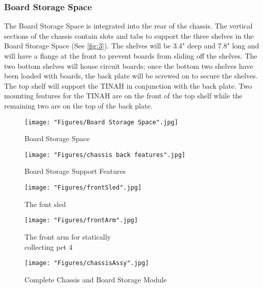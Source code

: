 \documentclass[11pt, oneside]{article} %
\begin{document}
		\subsubsection{Board Storage Space}

		The Board Storage Space is integrated into the rear of the chassis. The vertical sections of the chassis contain slots and tabs to support the three shelves in the Board Storage Space (See \autoref{fig:3}). The shelves will be 3.4" deep and 7.8" long and will have a flange at the front to prevent boards from sliding off the shelves. The two bottom shelves will house circuit boards; once the bottom two shelves have been loaded with boards, the back plate will be screwed on to secure the shelves. The top shelf will support the TINAH in conjunction with the back plate. Two mounting features for the TINAH are on the front of the top shelf while the remaining two are on the top of the back plate.
		
		\newpage
		\begin{figure}[ht]
			\centering
			\begin{minipage}[t]{.5\textwidth}
				\centering
				\texttt{[image: "Figures/Board Storage Space".jpg]}
				\caption[Board Storage Space]{Board Storage Space}
				\label{fig:2}
			\end{minipage}%
			\begin{minipage}[t]{.5\textwidth}
				\centering
				\texttt{[image: "Figures/chassis back features".jpg]}
				\caption[Board Storage Support Features]{Board Storage Support Features}
				\label{fig:3}
			\end{minipage}
		\end{figure}
		
		\begin{figure}[!ht]
			\begin{minipage}[t]{.5\textwidth}
				\centering
				\texttt{[image: "Figures/frontSled".jpg]}
				\caption[The Sled]{The font sled}
				\label{fig:front sled}
			\end{minipage}%
			\begin{minipage}[t]{.75\textwidth}
				\centering
				\texttt{[image: "Figures/frontArm".jpg]}
				\caption[Front Arm]{The front arm for statically \\ collecting pet 4}
				\label{fig:front arm}
			\end{minipage}
		\end{figure}
		
		\begin{figure}[ht]
			\centering
			\texttt{[image: "Figures/chassisAssy".jpg]}
			\caption[Complete Chassis and Board Storage Module]{Complete Chassis and Board Storage Module}
			\label{fig:chassisAssy}
		\end{figure}
	
\end{document}
